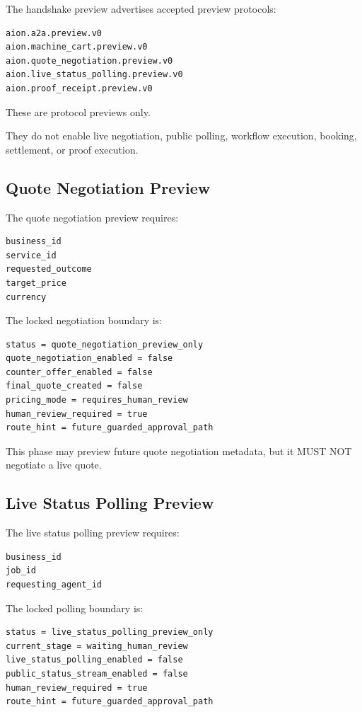 The handshake preview advertises accepted preview protocols:

\begin{verbatim}
aion.a2a.preview.v0
aion.machine_cart.preview.v0
aion.quote_negotiation.preview.v0
aion.live_status_polling.preview.v0
aion.proof_receipt.preview.v0
\end{verbatim}

These are protocol previews only.

They do not enable live negotiation, public polling, workflow execution, booking, settlement, or proof execution.

\subsection{Quote Negotiation Preview}

The quote negotiation preview requires:

\begin{verbatim}
business_id
service_id
requested_outcome
target_price
currency
\end{verbatim}

The locked negotiation boundary is:

\begin{verbatim}
status = quote_negotiation_preview_only
quote_negotiation_enabled = false
counter_offer_enabled = false
final_quote_created = false
pricing_mode = requires_human_review
human_review_required = true
route_hint = future_guarded_approval_path
\end{verbatim}

This phase may preview future quote negotiation metadata, but it MUST NOT negotiate a live quote.

\subsection{Live Status Polling Preview}

The live status polling preview requires:

\begin{verbatim}
business_id
job_id
requesting_agent_id
\end{verbatim}

The locked polling boundary is:

\begin{verbatim}
status = live_status_polling_preview_only
current_stage = waiting_human_review
live_status_polling_enabled = false
public_status_stream_enabled = false
human_review_required = true
route_hint = future_guarded_approval_path
\end{verbatim}

